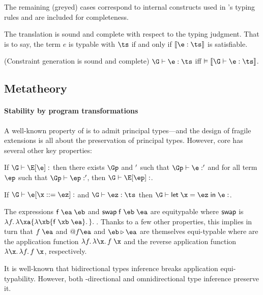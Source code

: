 \documentclass[acmsmall,screen,nonacm,review]{acmart}
\begin{document}
The remaining (greyed) cases  correspond to internal
constructs used in \OML's typing rules and are included for completeness.


The translation is sound and complete with respect to the typing judgment.
That is to say, the term $e$ is typable with $\ts$ if and only if
$\cinfer \e \ts$ is satisfiable.
%
\begin{theorem}{(Constraint generation is sound and complete)}
$\G \th \e : \ts$ iff\/
$\centails \csem {\G \th \e : \ts}$.
\end{theorem}

\subsection{Metatheory}
\label{sec:constraint-prop}


\paragraph{Stability by program transformations}

A well-known property of \ML is to admit principal types---and the design of
fragile \ML extensions is all about the preservation of principal types.
However, core \ML has several other key properties:
\begin{description}[font=\it,align=mydesc,topsep=1ex,itemsep=1ex,leftmargin=0ex]
\newcommand {\eswap}{\mathprefix  {swap}}

\item [Compositionality]
  If $\G \th \E \where \e : \t$ then there exists $\Gp$ and $\relax'$ such that
  $\Gp \th \e : \tp$ and for all term $\ep$ such that $\Gp \th \ep : \tp$,
  then $\G \th \E \where \ep : \t$.

\item [Factorization]
  If $\G \th \e \where {\x \is \ez} : \t$ and $\G \th \ez : \ts$ then
  $\G \th \elet \x \ez \e : \t$.


\item [Application equitypability]
  The expressions $\eappp f \ea \eb$ and $\eappp {\eswap f} \eb \ea$ are
  equitypable where $\eswap$ is $\efun f {\efun \xa {\efun \xb {\eappp f \xb
  \ea}}}$.  Thanks to a few other properties, this implies in turn that
  $\eapp f \ea$ and $\eApp f \ea$ and $\eb \ePipe \ea$ are themselves
  equi-typable where are the application function $\efun f \efun \x \eapp f
  \x$ and the reverse application function $\efun \x \efun f \eapp f \x$,
  respectively.

\end{description}
It is well-known that bidirectional types inference breaks application
equi-typability. However, both \Geninst-directional and omnidirectional type
inference preserve it.
\end{document}
